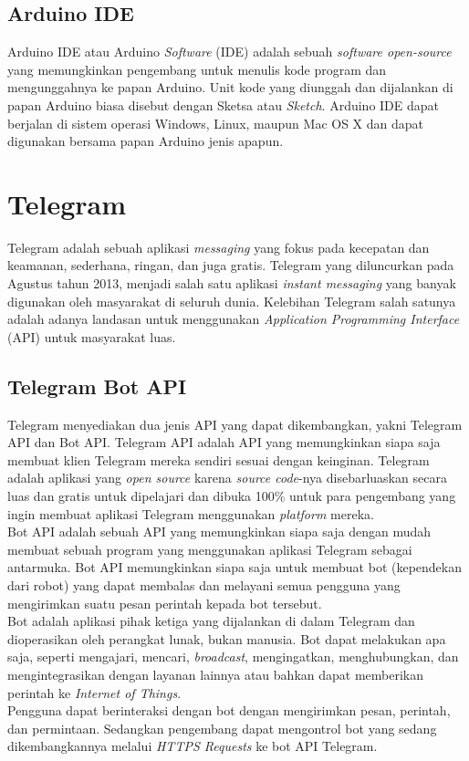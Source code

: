 \subsection{Arduino IDE}
\tab Arduino IDE atau Arduino \textit{Software} (IDE) adalah sebuah \textit{software open-source} yang memungkinkan pengembang untuk menulis kode program dan mengunggahnya ke papan Arduino. Unit kode yang diunggah dan dijalankan di papan Arduino biasa disebut dengan Sketsa atau \textit{Sketch}. Arduino IDE dapat berjalan di sistem operasi Windows, Linux, maupun Mac OS X dan dapat digunakan bersama papan Arduino jenis apapun. 

\section{Telegram}
\tab Telegram adalah sebuah aplikasi \textit{messaging} yang fokus pada kecepatan dan keamanan, sederhana, ringan, dan juga gratis. Telegram yang diluncurkan pada Agustus tahun 2013, menjadi salah satu aplikasi \textit{instant messaging} yang banyak digunakan oleh masyarakat di seluruh dunia. Kelebihan Telegram salah satunya adalah adanya landasan untuk menggunakan \textit{Application Programming Interface} (API) untuk
masyarakat luas.

\subsection{Telegram Bot API}
\tab Telegram menyediakan dua jenis API yang dapat dikembangkan, yakni  Telegram API dan Bot API. Telegram API adalah API yang memungkinkan siapa saja membuat klien Telegram mereka sendiri sesuai dengan keinginan. Telegram adalah aplikasi yang \textit{open source} karena \textit{source code}-nya disebarluaskan secara luas dan gratis untuk dipelajari dan dibuka 100\% untuk para pengembang yang ingin membuat aplikasi Telegram menggunakan \textit{platform} mereka. \\
\tab Bot API adalah sebuah API yang memungkinkan siapa saja dengan mudah membuat sebuah program yang menggunakan aplikasi Telegram sebagai antarmuka. Bot API memungkinkan siapa saja untuk membuat bot (kependekan dari robot) yang dapat membalas dan melayani semua pengguna yang mengirimkan suatu pesan perintah kepada bot tersebut. \\
\tab Bot adalah aplikasi pihak ketiga yang dijalankan di dalam Telegram dan dioperasikan oleh perangkat lunak, bukan manusia. Bot dapat melakukan apa saja, seperti mengajari, mencari, \textit{broadcast}, mengingatkan, menghubungkan, dan mengintegrasikan dengan layanan lainnya atau bahkan dapat memberikan perintah ke \textit{Internet of Things}.\\
\tab Pengguna dapat berinteraksi dengan bot dengan mengirimkan pesan, perintah, dan permintaan. Sedangkan pengembang dapat mengontrol bot yang sedang dikembangkannya melalui \textit{HTTPS Requests} ke bot API Telegram.

